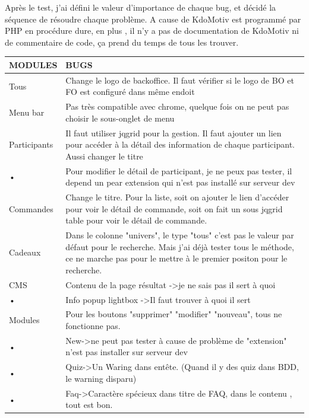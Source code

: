 Après le test, j'ai défini le valeur d'importance de chaque bug, et décidé la séquence de résoudre chaque problème. A cause de KdoMotiv est programmé par PHP en procédure dure, en plus , il n'y a pas de documentation de KdoMotiv ni de commentaire de code, ça prend du temps de tous les trouver.

\begin{table}[htbp]
\renewcommand{\tabularxcolumn}[1]{>{\arraybackslash}m{#1}}
\begin{tabularx}{\textwidth}{lX}
\hline 
MODULES & BUGS \\ 
\hline 
Tous
 & Change le logo de backoffice. Il faut vérifier si le logo de BO et FO est configuré dans même endoit
 \\ 
\hline 
Menu bar
 & Pas très compatible avec chrome, quelque fois on ne peut pas choisir le sous-onglet de menu
 \\ 
\hline 
Participants
 & Il faut utiliser jqgrid pour la gestion. Il faut ajouter un lien pour accéder à la détail des information de chaque participant. Aussi changer le titre
 \\ 
\hline 
• & Pour modifier le détail de participant, je ne peux pas tester, il depend un pear extension qui n'est pas installé sur serveur dev
 \\ 
\hline 
Commandes
 & Change le titre. Pour la liste, soit on ajouter le lien d'accéder pour voir le détail de commande, soit on fait un sous jqgrid table pour voir le détail de commande.
 \\ 
\hline 
Cadeaux
 & Dans le colonne  "univers", le type "tous" c'est pas le valeur par défaut pour le recherche. Mais j'ai déjà tester tous le méthode, ce ne marche pas pour le mettre à le premier positon pour le recherche.
 \\ 
\hline 
CMS
 & Contenu de la page résultat -\textgreater je ne sais pas il sert à quoi
 \\ 
\hline 
• & Info popup lightbox -\textgreater Il faut trouver à quoi il sert 
 \\ 
\hline 
Modules
 & Pour les boutons "supprimer" "modifier" "nouveau", tous ne fonctionne pas.
 \\ 
\hline 
• & New-\textgreater ne peut pas tester à cause de problème de "extension"  n'est pas installer sur serveur dev
 \\ 
\hline 
• & Quiz-\textgreater Un Waring dans entête.  (Quand il y des quiz dans BDD, le warning disparu)  
 \\ 
\hline 
• & Faq-\textgreater Caractère spécieux dans titre de FAQ, dans le contenu , tout est bon.   

\end{tabularx}
\end{table}
